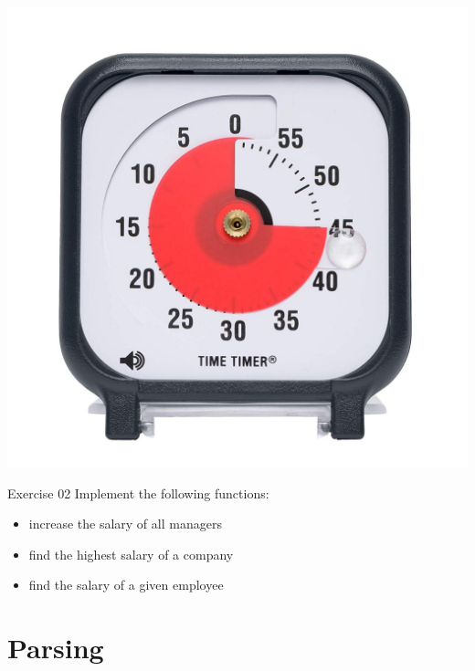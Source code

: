 \documentclass{beamer}
\begin{document}
\begin{frame}
 \begin{center} 
   \includegraphics[scale=0.15]{images/timer.pdf}
 \end{center}   
\end{frame}

\begin{frame}
  \begin{block}{Exercise 02}
    Implement the following functions:

    \begin{itemize}
      \item increase the salary of all managers
      \item find the highest salary of a company
      \item find the salary of a given employee
    \end{itemize}
  \end{block}  
\end{frame}

\section{Parsing}

\end{document}
